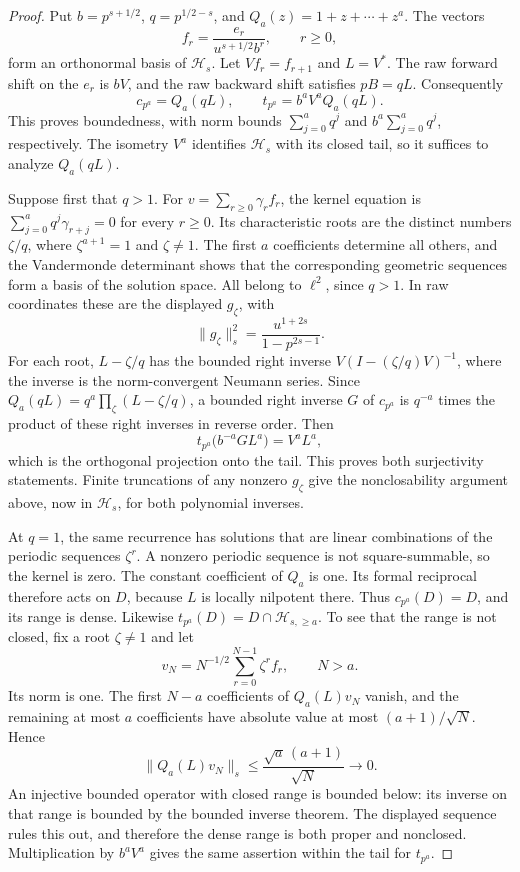 \begin{proof}
Put \(b=p^{s+1/2}\), \(q=p^{1/2-s}\), and
\(Q_a(z)=1+z+\cdots+z^a\). The vectors
\[
 f_r=\frac{e_r}{u^{s+1/2}b^r},\qquad r\ge0,
\]
form an orthonormal basis of \(\mathcal H_s\). Let \(Vf_r=f_{r+1}\)
and \(L=V^*\). The raw forward shift on the \(e_r\) is \(bV\),
and the raw backward shift satisfies \(pB=qL\). Consequently
\begin{equation}
\label{v4-arith:ado:weighted-shift-model}
 c_{p^a}=Q_a(qL),\qquad
 t_{p^a}=b^a V^aQ_a(qL).
\end{equation}
This proves boundedness, with norm bounds
\(\sum_{j=0}^aq^j\) and \(b^a\sum_{j=0}^aq^j\), respectively.
The isometry \(V^a\) identifies \(\mathcal H_s\) with its closed tail,
so it suffices to analyze \(Q_a(qL)\).

Suppose first that \(q>1\). For
\(v=\sum_{r\ge0}\gamma_rf_r\), the kernel equation is
\(\sum_{j=0}^aq^j\gamma_{r+j}=0\) for every \(r\ge0\).
Its characteristic roots are the distinct numbers \(\zeta/q\),
where \(\zeta^{a+1}=1\) and \(\zeta\ne1\).
The first \(a\) coefficients determine all others, and the
Vandermonde determinant shows that the corresponding geometric
sequences form a basis of the solution space. All belong to
\(\ell^2\), since \(q>1\). In raw coordinates these are the displayed
\(g_\zeta\), with
\[
 \|g_\zeta\|_s^2=
 \frac{u^{1+2s}}{1-p^{2s-1}}.
\]
For each root, \(L-\zeta/q\) has the bounded right inverse
\(V(I-(\zeta/q)V)^{-1}\), where the inverse is the norm-convergent
Neumann series. Since
\(Q_a(qL)=q^a\prod_\zeta(L-\zeta/q)\), a bounded right inverse
\(G\) of \(c_{p^a}\) is \(q^{-a}\) times the product of these right
inverses in reverse order. Then
\[
 t_{p^a}\bigl(b^{-a}G L^a\bigr)=V^aL^a,
\]
which is the orthogonal projection onto the tail. This proves both
surjectivity statements. Finite truncations of any nonzero
\(g_\zeta\) give the nonclosability argument above, now in
\(\mathcal H_s\), for both polynomial inverses.

At \(q=1\), the same recurrence has solutions that are linear
combinations of the periodic sequences \(\zeta^r\).
A nonzero periodic sequence is not square-summable, so the kernel
is zero. The constant coefficient of \(Q_a\) is one. Its formal
reciprocal therefore acts on \(D\), because \(L\) is locally
nilpotent there. Thus \(c_{p^a}(D)=D\), and its range is dense.
Likewise \(t_{p^a}(D)=D\cap\mathcal H_{s,\ge a}\).
To see that the range is not closed, fix a root \(\zeta\ne1\) and
let
\[
 v_N=N^{-1/2}\sum_{r=0}^{N-1}\zeta^r f_r,\qquad N>a.
\]
Its norm is one. The first \(N-a\) coefficients of
\(Q_a(L)v_N\) vanish, and the remaining at most \(a\) coefficients
have absolute value at most \((a+1)/\sqrt N\). Hence
\[
 \|Q_a(L)v_N\|_s\le\frac{\sqrt a\,(a+1)}{\sqrt N}\longrightarrow0.
\]
An injective bounded operator with closed range is bounded below:
its inverse on that range is bounded by the bounded inverse theorem.
The displayed sequence rules this out, and therefore the dense range
is both proper and nonclosed. Multiplication by \(b^aV^a\) gives
the same assertion within the tail for \(t_{p^a}\).


\end{proof}
